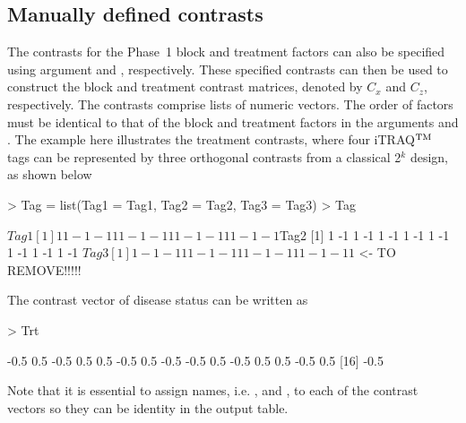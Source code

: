\documentclass[article]{jss}
\begin{document}
\subsection{Manually defined contrasts}
The contrasts for the Phase~1 block and treatment factors can also be specified using argument  and , respectively. These specified contrasts can then be used to construct the block and treatment contrast matrices, denoted by $C_x$ and $C_z$, respectively. The contrasts comprise lists of numeric vectors. The order of factors must be identical to that of the block and treatment factors in the arguments  and . The example here illustrates the treatment contrasts, where four iTRAQ$^{\rm TM}$ tags can be represented by three orthogonal contrasts from a classical 2$^k$ design, as shown below
\begin{CodeChunk}
\begin{CodeInput}
> Tag = list(Tag1 = Tag1, Tag2 = Tag2, Tag3 = Tag3)
> Tag
\end{CodeInput}
\begin{CodeOutput}
$Tag1
 [1]  1  1 -1 -1  1  1 -1 -1  1  1 -1 -1  1  1 -1 -1
$Tag2
 [1]  1 -1  1 -1  1 -1  1 -1  1 -1  1 -1  1 -1  1 -1
$Tag3
 [1]  1 -1 -1  1  1 -1 -1  1  1 -1 -1  1  1 -1 -1  1
$ <- TO REMOVE!!!!!
\end{CodeOutput}
\end{CodeChunk}
 The contrast vector of disease status can be written as
\begin{CodeChunk}
\begin{CodeInput}
> Trt
\end{CodeInput}
\begin{CodeOutput}
 [1] -0.5  0.5 -0.5  0.5  0.5 -0.5  0.5 -0.5 -0.5  0.5 -0.5  0.5  0.5 -0.5  0.5
[16] -0.5
\end{CodeOutput}
\end{CodeChunk}
Note that it is essential to assign names, i.e. ,  and , to each of the contrast vectors so they can be identity in the output table.
\end{document}
